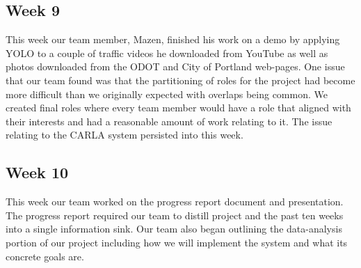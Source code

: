 \subsection{Week 9}
This week our team member, Mazen, finished his work on a demo by applying YOLO to a couple of traffic videos he downloaded from YouTube as well as photos downloaded from the ODOT and City of Portland web-pages. One issue that our team found was that the partitioning of roles for the project had become more difficult than we originally expected with overlaps being common. We created final roles where every team member would have a role that aligned with their interests and had a reasonable amount of work relating to it. The issue relating to the CARLA system persisted into this week.  

\subsection{Week 10}
This week our team worked on the progress report document and presentation. The progress report required our team to distill project and the past ten weeks into a single information sink. Our team also began outlining the data-analysis portion of our project including how we will implement the system and what its concrete goals are. 

